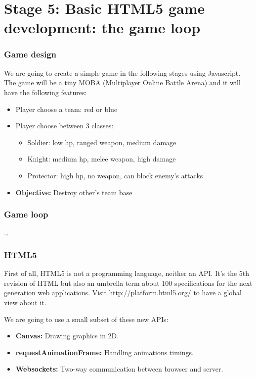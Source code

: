 \section{Stage 5: Basic HTML5 game development: the game loop}

\begin{frame}[fragile]
\end{frame}

\begin{frame}[fragile]
  \frametitle{Game design}

  We are going to create a simple game in the following stages using Javascript. The game will be a tiny MOBA (Multiplayer Online Battle Arena) and it will have the following features:

  \pause

  \begin{itemize}
    \pause \item Player choose a team: red or blue
    \pause \item Player choose between 3 classes:
      \begin{itemize}
        \item Soldier: low hp, ranged weapon, medium damage
        \item Knight: medium hp, melee weapon, high damage
        \item Protector: high hp, no weapon, can block enemy's attacks
      \end{itemize}
    \pause \item \textbf{Objective:} Destroy other's team base
  \end{itemize}
\end{frame}

\begin{frame}[fragile]
  \frametitle{Game loop}

  \ldots
\end{frame}

\begin{frame}[fragile]
  \frametitle{HTML5}

  First of all, HTML5 is not a programming language, neither an API. It's the 5th revision of HTML but also an umbrella term about 100 specifications for the next generation web applications.
  Visit \url{http://platform.html5.org/} to have a global view about it.

  \pause

  We are going to use a small subset of these new APIs:
  \begin{itemize}
    \pause \item \textbf{Canvas:} Drawing graphics in 2D.
    \pause \item \textbf{requestAnimationFrame:} Handling animations timings.
    \pause \item \textbf{Websockets:} Two-way communication between browser and server.
  \end{itemize}
\end{frame}

